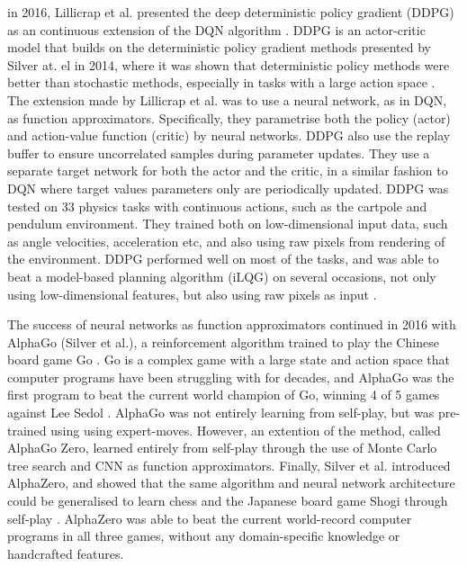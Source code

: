 \documentclass[class=book, crop=false]{standalone}
\begin{document}
in 2016, Lillicrap et al. presented the deep deterministic policy gradient (DDPG) as an continuous extension of the DQN algorithm  \cite{DBLP:journals/corr/LillicrapHPHETS15}. DDPG is an actor-critic model that builds on the deterministic policy gradient methods presented by Silver at. el in 2014, where it was shown that deterministic policy methods were better than stochastic methods, especially in tasks with a large action space \cite{pmlr-v32-silver14}. The extension made by Lillicrap et al. was to use a neural network, as in DQN, as function approximators. Specifically, they parametrise both the policy (actor) and action-value function (critic) by neural networks. DDPG also use the replay buffer to ensure uncorrelated samples during parameter updates. They use a separate target network for both the actor and the critic, in a similar fashion to DQN where target values parameters only are periodically updated. DDPG was tested on 33 physics tasks with continuous actions, such as the cartpole and pendulum  environment. They trained both on low-dimensional input data, such as angle velocities, acceleration etc, and also using raw pixels from rendering of the environment. DDPG performed well on most of the tasks, and was able to beat a model-based planning algorithm (iLQG) on several occasions, not only using low-dimensional features, but also using raw pixels as input \cite{DBLP:journals/corr/LillicrapHPHETS15}.

The success of neural networks as function approximators continued in 2016 with AlphaGo (Silver et al.), a reinforcement algorithm trained to play the Chinese board game Go \cite{alphago}. Go is a complex game with a large state and action space that computer programs have been struggling with for decades, and AlphaGo was the first program to beat the current world champion of Go, winning 4 of 5 games against Lee Sedol \cite{Sutton1998}. AlphaGo was not entirely learning from self-play, but was pre-trained using using expert-moves. However, an extention of the method, called AlphaGo Zero, learned entirely from self-play through the use of Monte Carlo tree search and CNN as function approximators. Finally,  Silver et al. introduced AlphaZero, and showed that the same algorithm and neural network architecture could be generalised to learn chess and the Japanese board game Shogi through self-play \cite{alphazero}. AlphaZero was able to beat the current world-record computer programs in all three games, without any domain-specific knowledge or handcrafted features. 
\end{document}
